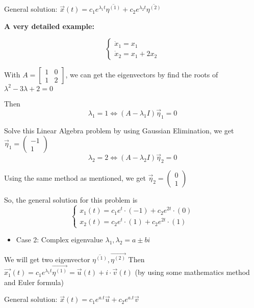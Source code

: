 \documentclass[a4paper]{article}
\begin{document}
General solution: $\vec{x}(t)=c_{1} e^{\lambda_{1} t} \overline{\eta^{(1)}}+c_{2} e^{\lambda_{2} t} \overline{\eta^{(2)}}$

{\bf  A very detailed example:}

$$\left\{\begin{array}{l}\dot{x}_{1}=x_{1} \\ \dot{x}_{2}=x_{1}+2 x_{2}\end{array}\right.$$

With $A=\left[\begin{array}{ll}1 & 0 \\ 1 & 2\end{array}\right]$, we can get the eigenvectors by find the roots of $\lambda^{2}-3 \lambda+2=0$

Then
$$\lambda_{1}=1 \Leftrightarrow\left(A-\lambda_{1} I\right) \vec{\eta}_{1}=0$$

Solve this Linear Algebra problem by using Gaussian Elimination, we get $\vec{\eta}_{1}=\left(\begin{array}{l}-1 \\ 1\end{array}\right)$
$$\lambda_{2}=2 \Leftrightarrow\left(A-\lambda_{2} I\right) \vec{\eta}_{2}=0$$

Using the same method as mentioned, we get $\vec{\eta}_{2}=\left(\begin{array}{l}0 \\ 1\end{array}\right)$

So, the general solution for this problem is
$$
\left\{\begin{array}{l}
	x_{1}(t)=c_{1} e^{t} \cdot(-1)+c_{2} e^{2 t} \cdot(0) \\
	x_{2}(t)=c_{2} e^{t} \cdot(1)+c_{2} e^{2 t} \cdot(1)
\end{array}\right.
$$

\begin{itemize}
	\item Case 2: Complex eigenvalue $\lambda_{1}, \lambda_{2}=a \pm b i$
\end{itemize}

We will get two eigenvector $\overline{\eta^{(1)}}, \overrightarrow{\eta^{(2)}}$ Then $\overrightarrow{x_{1}}(t)=c_{1} e^{\lambda_{1} t} \overrightarrow{\eta^{(1)}}=\vec{u}(t)+i \cdot \vec{v}(t)$ (by using some mathematics method and Euler formula)

General solution: $\vec{x}(t)=c_{1} e^{a . t} \vec{u}+c_{2} e^{a . t} \vec{v}$
\end{document}
